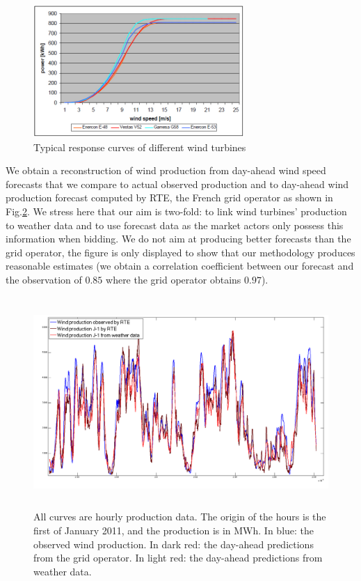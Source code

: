 \begin{figure}[!ht]
\begin{center} \includegraphics[height=50mm]{forqgis/ref-powercurve.png}
\end{center}
\caption{\small Typical response curves of different wind turbines}
\label{fig:typpowercurve}
\end{figure}


We obtain a reconstruction of wind production from day-ahead wind speed forecasts that we compare to actual observed production and to day-ahead wind production forecast computed by RTE, the French grid operator as shown in Fig.\ref{fig:windreco1DA}. We stress here that our aim is two-fold: to link wind turbines' production to weather data and to use forecast data as the market actors only possess this information when bidding. We do not aim at producing better forecasts than the grid operator, the figure is only displayed to show that our methodology produces reasonable estimates (we obtain a correlation coefficient between our forecast and the observation of $0.85$ where the grid operator obtains $0.97$).  

\begin{figure}[!ht]
\begin{center} \includegraphics[height=80mm]{forqgis/windprodD1A.png}
\end{center}
\caption{\small All curves are hourly production data. The origin of the hours is the first of January 2011, and the production is in MWh. In blue: the observed wind production. In dark red: the day-ahead predictions from the grid operator. In light red: the day-ahead predictions from weather data.}
\label{fig:windreco1DA}
\end{figure}


